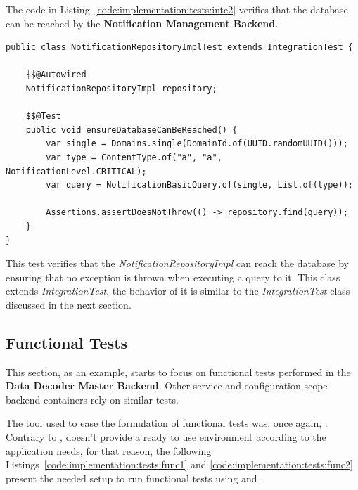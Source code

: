 The code in Listing~\ref{code:implementation:tests:inte2} verifies that the database can be reached by the \textbf{Notification Management Backend}.

\begin{lstlisting}[style=Java, caption=Integration Test - Database - \textbf{Notification Management Backend}, label={code:implementation:tests:inte2}]
public class NotificationRepositoryImplTest extends IntegrationTest {

    $$@Autowired
    NotificationRepositoryImpl repository;

    $$@Test
    public void ensureDatabaseCanBeReached() {
        var single = Domains.single(DomainId.of(UUID.randomUUID()));
        var type = ContentType.of("a", "a", NotificationLevel.CRITICAL);
        var query = NotificationBasicQuery.of(single, List.of(type));
        
        Assertions.assertDoesNotThrow(() -> repository.find(query));
    }
}    
\end{lstlisting}

This test verifies that the \textit{NotificationRepositoryImpl} can reach the database by ensuring that no exception is thrown when executing a query to it. This class extends \textit{IntegrationTest}, the behavior of it is similar to the \textit{IntegrationTest} class discussed in the next section. 

\subsection{Functional Tests}
\label{subsec:implementation:tests:functional}

This section, as an example, starts to focus on functional tests performed in the \textbf{Data Decoder Master Backend}. Other service and configuration scope backend containers rely on similar tests.

The tool used to ease the formulation of functional tests was, once again, . Contrary to ,  doesn't provide a ready to use environment according to the application needs, for that reason, the following Listings~\ref{code:implementation:tests:func1} and \ref{code:implementation:tests:func2} present the needed setup to run functional tests using  and .


